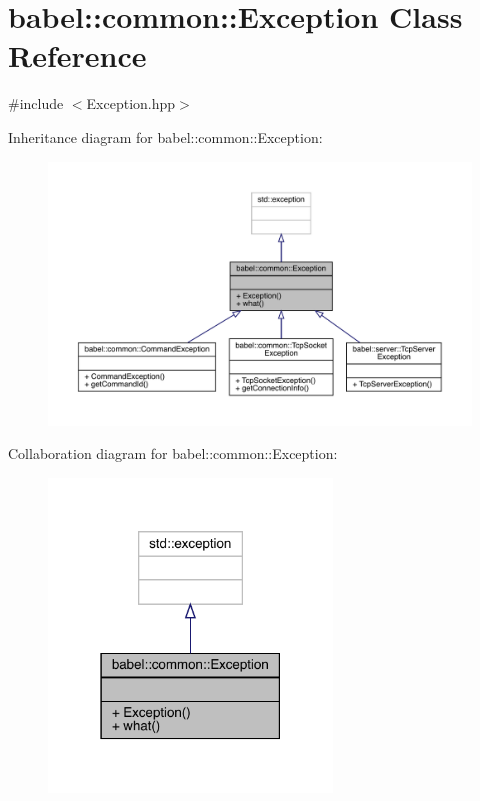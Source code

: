 \hypertarget{classbabel_1_1common_1_1_exception}{}\section{babel\+:\+:common\+:\+:Exception Class Reference}
\label{classbabel_1_1common_1_1_exception}


{\ttfamily \#include $<$Exception.\+hpp$>$}



Inheritance diagram for babel\+:\+:common\+:\+:Exception\+:\nopagebreak
\begin{figure}[H]
\begin{center}
\leavevmode
\includegraphics[width=350pt]{classbabel_1_1common_1_1_exception__inherit__graph}
\end{center}
\end{figure}


Collaboration diagram for babel\+:\+:common\+:\+:Exception\+:\nopagebreak
\begin{figure}[H]
\begin{center}
\leavevmode
\includegraphics[width=214pt]{classbabel_1_1common_1_1_exception__coll__graph}
\end{center}
\end{figure}
